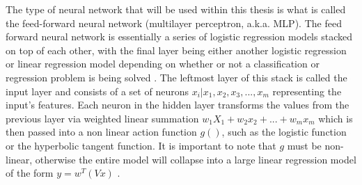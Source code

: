 The type of neural network that will be used within this thesis is
what is called the feed-forward neural network (multilayer perceptron,
a.k.a. MLP). The feed forward neural network is essentially a series of
logistic regression models stacked on top of each other, with the
final layer being either another logistic regression or linear
regression model depending on whether or not a classification or
regression problem is being solved \cite{Murphy}. The leftmost
layer of this stack is called the input layer and consists of a set of
neurons ${x_i|x_1,x_2,x_3,...,x_m}$ representing the input's
features. Each neuron in the hidden layer transforms the values from
the previous layer via weighted linear summation $w_1X_1 + w_2x_2 +...+w_mx_m$
which is then passed into a non linear action function $g()$, such as the
logistic function or the hyperbolic tangent function. It is important to note
that $g$ must be non-linear, otherwise the entire model will collapse into a
large linear regression model of the form $y = w^T(Vx)$ \cite{Murphy}.

